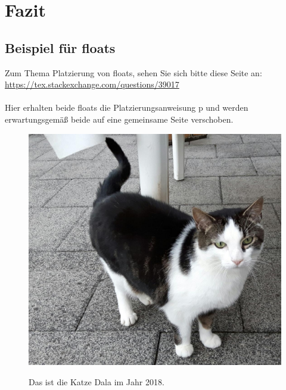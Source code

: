 \chapter{Fazit}

\section{Beispiel für floats}

Zum Thema Platzierung von floats, sehen Sie sich bitte diese Seite an:\\
\url{https://tex.stackexchange.com/questions/39017}\\
\ \\
Hier erhalten beide floats die Platzierungsanweisung p und werden erwartungsgemäß beide auf eine gemeinsame Seite verschoben.

\Blindtext

\begin{figure}[p]
\begin{center}
\includegraphics[scale=0.5]{img/Dala}
\label{figDala}
\caption[Kurztitel Katze]{Das ist die Katze Dala im Jahr 2018.}
\end{center}
\end{figure}


